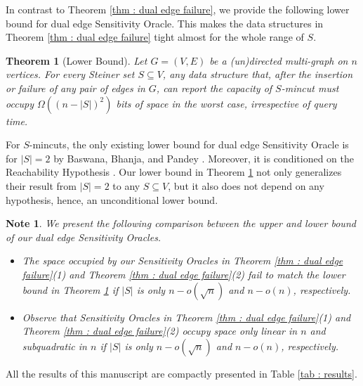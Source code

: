 \documentclass[letterpaper,11pt]{article}
\newtheorem{theorem}{Theorem}[]
\newtheorem{note}{Note}[]
\begin{document}
In contrast to Theorem \ref{thm : dual edge failure}, we provide the following lower bound for dual edge Sensitivity Oracle. This makes the data structures in Theorem \ref{thm : dual edge failure} tight almost for the whole range of $S$.
\begin{theorem} [Lower Bound] \label{thm : lower bound on dual edge failure}
    Let $G=(V,E)$ be a (un)directed multi-graph on $n$ vertices. For every Steiner set $S\subseteq V$, any data structure that, after the insertion or failure of any pair of edges in $G$, can report the capacity of $S$-mincut must occupy $\Omega((n-|S|)^2)$ bits of space in the worst case, irrespective of query time. 
\end{theorem}
For $S$-mincuts, the only existing lower bound for dual edge Sensitivity Oracle is for $|S|=2$ by Baswana, Bhanja, and Pandey \cite{DBLP:journals/talg/BaswanaBP23}. Moreover, it is conditioned on the Reachability Hypothesis \cite{DBLP:conf/wads/GoldsteinKLP17, DBLP:journals/siamcomp/Patrascu11}. Our lower bound in Theorem \ref{thm : lower bound on dual edge failure} not only generalizes their result from $|S|=2$ to any $S\subseteq V$, but it also does not depend on any hypothesis, hence, an unconditional lower bound.
\begin{note}
    We present the following comparison between the upper and lower bound of our dual edge Sensitivity Oracles. 
\begin{itemize}
     \item  The space occupied by our Sensitivity Oracles in Theorem \ref{thm : dual edge failure}(1) and Theorem \ref{thm : dual edge failure}(2) fail to match the lower bound in Theorem \ref{thm : lower bound on dual edge failure} if $|S|$ is only $n-o(\sqrt{n})$ and $n-o(n)$, respectively. 
    \item Observe that Sensitivity Oracles in Theorem \ref{thm : dual edge failure}(1) and Theorem \ref{thm : dual edge failure}(2) occupy space only linear in $n$ and subquadratic in $n$ if $|S|$ is only $n-o(\sqrt{n})$ and $n-o(n)$, respectively.
\end{itemize} 
\end{note}

All the results of this manuscript are compactly presented in Table \ref{tab : results}.
\end{document}

